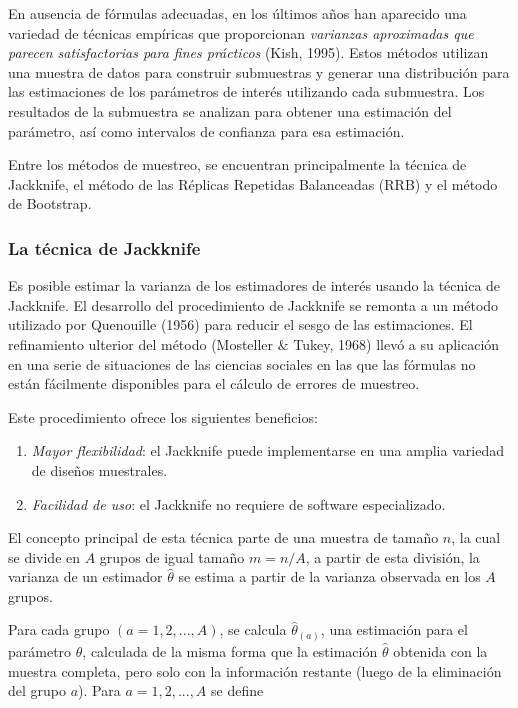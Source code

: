 En ausencia de fórmulas adecuadas, en los últimos años han aparecido una variedad de técnicas empíricas que proporcionan \emph{varianzas aproximadas que parecen satisfactorias para fines prácticos} (Kish, 1995). Estos métodos utilizan una muestra de datos para construir submuestras y generar una distribución para las estimaciones de los parámetros de interés utilizando cada submuestra. Los resultados de la submuestra se analizan para obtener una estimación del parámetro, así como intervalos de confianza para esa estimación.

Entre los métodos de muestreo, se encuentran principalmente la técnica de Jackknife, el método de las Réplicas Repetidas Balanceadas (RRB) y el método de Bootstrap.

\hypertarget{la-tecnica-de-jackknife}{%
\subsubsection*{La técnica de Jackknife}\label{la-tecnica-de-jackknife}}


Es posible estimar la varianza de los estimadores de interés usando la técnica de Jackknife. El desarrollo del procedimiento de Jackknife se remonta a un método utilizado por Quenouille (1956) para reducir el sesgo de las estimaciones. El refinamiento ulterior del método (Mosteller \& Tukey, 1968) llevó a su aplicación en una serie de situaciones de las ciencias sociales en las que las fórmulas no están fácilmente disponibles para el cálculo de errores de muestreo.

Este procedimiento ofrece los siguientes beneficios:

\begin{enumerate}
\def\labelenumi{\arabic{enumi}.}
\tightlist
\item
  \emph{Mayor flexibilidad}: el Jackknife puede implementarse en una amplia variedad de diseños muestrales.
\item
  \emph{Facilidad de uso}: el Jackknife no requiere de software especializado.
\end{enumerate}

El concepto principal de esta técnica parte de una muestra de tamaño \(n\), la cual se divide en \(A\) grupos de igual
tamaño \(m=n/A\), a partir de esta división, la varianza de un estimador \(\hat{\theta}\) se estima a partir de la varianza observada en los \(A\) grupos.

Para cada grupo \((a=1,2,...,A)\), se calcula \(\hat{\theta}_{(a)}\), una estimación para el parámetro \(\theta\), calculada de la misma forma que la estimación \(\hat{\theta}\) obtenida con la muestra completa, pero solo con la información restante (luego de la eliminación del grupo \(a\)). Para \(a=1,2,...,A\) se define

